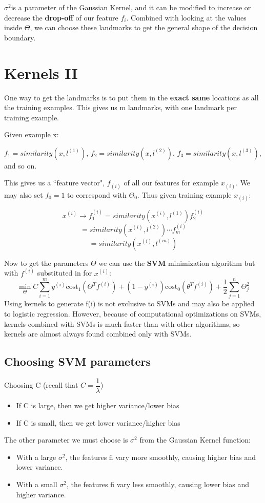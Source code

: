 $\sigma^2$is a parameter of the Gaussian Kernel, and it can be modified to increase or decrease the \textbf{drop-off} of our feature $f_i$. Combined with looking at the values inside $\Theta$, we can choose these landmarks to get the general shape of the decision boundary.

\section{Kernels II}
One way to get the landmarks is to put them in the \textbf{exact same} locations as all the training examples. This gives us m landmarks, with one landmark per training example.

Given example x:

$f_1 = similarity(x,l^{(1)})$, $f_2 = similarity(x,l^{(2)})$, $f_3 = similarity(x,l^{(3)})$, and so on.

This gives us a ``feature vector", $f_{(i)}$ of all our features for example $x_{(i)}$. We may also set $f_0 = 1$ to correspond with $\Theta_0$. Thus given training example $x_{(i)}$:

$$x^{(i)} \rightarrow f^{(i)}_1=similarity(x^{(i)},l^{(1)})f^{(i)}_2$$
$$=similarity(x^{(i)},l^{(2)})\cdots f^{(i)}_m$$
$$=similarity(x^{(i)},l^{(m)})$$

Now to get the parameters $\Theta$ we can use the \textbf{SVM} minimization algorithm but with $f^{(i)}$ substituted in for $x^{(i)}$:
$$
\min_{\Theta} C \sum_{i=1}^m y^{(i)}\text{cost}_1(\Theta^Tf^{(i)}) + (1 - y^{(i)})\text{cost}_0(\theta^Tf^{(i)}) + \dfrac{1}{2}\sum_{j=1}^n \Theta^2_j
$$
Using kernels to generate f(i) is not exclusive to SVMs and may also be applied to logistic regression. However, because of computational optimizations on SVMs, kernels combined with SVMs is much faster than with other algorithms, so kernels are almost always found combined only with SVMs.
\subsection{Choosing SVM parameters}
Choosing C (recall that $C = \dfrac{1}{\lambda}$)
\begin{itemize}
\item If C is large, then we get higher variance/lower bias
\item If C is small, then we get lower variance/higher bias
\end{itemize}

The other parameter we must choose is $\sigma^2$ from the Gaussian Kernel function:
\begin{itemize}
\item With a large $\sigma^2$, the features fi vary more smoothly, causing higher bias and lower variance.
\item With a small $\sigma^2$, the features fi vary less smoothly, causing lower bias and higher variance.
\end{itemize}

